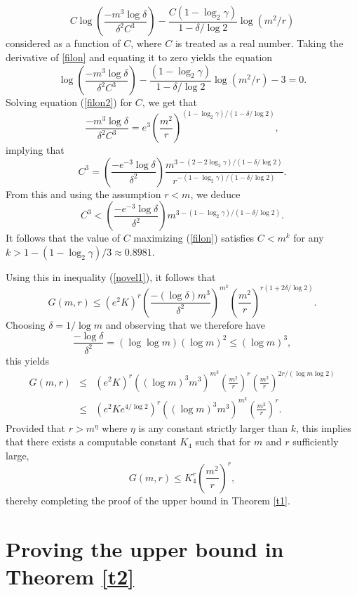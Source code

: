 \documentclass{article}
\theoremstyle{definition}
\begin{document}
\begin{equation}\label{filon}
C\log\left(\frac{-m^3\log \delta}{\delta^2 C^3}\right)-\frac{C(1-\log_2\gamma)}{1-\delta/\log 2}\log(m^2/r)
\end{equation}
considered as a function of $C$, where $C$ is treated as a real number. Taking the derivative of \eqref{filon} and equating it to zero yields the equation
\begin{equation}\label{filon2}
\log\left(\frac{-m^3\log \delta}{\delta^2 C^3}\right)-\frac{(1-\log_2\gamma)}{1-\delta/\log 2}\log(m^2/r)-3=0.
\end{equation}
Solving equation (\ref{filon2}) for $C$, we get that
$$
\frac{-m^3\log \delta}{\delta^2 C^3} =e^3 \left(\frac{m^2}{r}\right)^{(1-\log_2\gamma)/(1-\delta/\log 2)},$$
implying that
$$C^3=\left(\frac{-e^{-3}\log \delta}{\delta^2}\right)\frac{m^{3-(2-2\log_2\gamma)/(1-\delta/\log 2)}}{r^{-(1-\log_2\gamma)/(1-\delta/\log 2)}}.
$$
From this and using the assumption $r<m$, we deduce
$$
C^3<\left(\frac{-e^{-3}\log \delta}{\delta^2}\right)m^{3-(1-\log_2\gamma)/(1-\delta/\log 2)}.
$$
It follows that the value of $C$ maximizing (\ref{filon}) satisfies $C<m^k$ for any $k>1-(1-\log_2 \gamma)/3\approx 0.8981$.

Using this in inequality (\ref{novel1}), it follows that
$$
G(m,r) \le  (e^2K)^r\left(\frac{-(\log \delta) m^{3}}{\delta^2}\right)^{m^k}\left(\frac{m^2}{r}\right)^{r(1+2\delta/\log 2)}.
$$
Choosing $\delta=1/\log m$ and observing that we therefore have $$ \frac{-\log \delta}{\delta^2} = (\log \log m)(\log m)^2 \le (\log m)^3,$$ this yields
\begin{eqnarray*}
G(m,r)&\le& (e^2K)^r\left((\log m)^3 m^{3}\right)^{m^k}\left(\frac{m^2}{r}\right)^r\left(\frac{m^2}{r}\right)^{2r/(\log m \log 2)}\\
&\le& (e^2Ke^{4/\log 2})^r\left( (\log m)^3 m^{3}\right)^{m^k}\left(\frac{m^2}{r}\right)^r.
\end{eqnarray*}
Provided that $r>m^{\eta}$ where $\eta$ is any constant strictly larger than $k$, this implies that there exists a computable constant $K_4$ such that for $m$ and $r$ sufficiently large,
$$
G(m,r)\le K_4^r\left(\frac{m^2}{r}\right)^{r},
$$
thereby  completing the proof of the upper bound in Theorem \ref{t1}.




\section{Proving the upper bound in Theorem \ref{t2}} %
\end{document}
